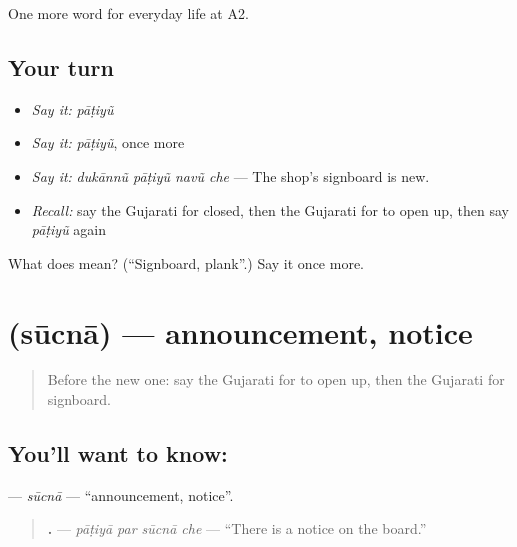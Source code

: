 \begin{grammarlens}[title={What you've built}]
One more word for everyday life at A2.
\end{grammarlens}

\subsection*{Your turn}
\begin{itemize}
\raggedright
  \item \emph{Say it:} \emph{pāṭiyũ}
  \item \emph{Say it:} \emph{pāṭiyũ}, once more
  \item \emph{Say it:} \emph{dukānnũ pāṭiyũ navũ che} — The shop's signboard is new.
  \item \emph{Recall:} say the Gujarati for closed, then the Gujarati for to open up, then say \emph{pāṭiyũ} again
\end{itemize}

\begin{tcolorbox}[breakable,colback=teal!4,colframe=teal!35!black,title={Before you move on}]
What does  mean? (\textquotedblleft{}Signboard, plank\textquotedblright{}.) Say it once more.
\end{tcolorbox}
\section[\texorpdfstring{\gu{સૂચના} (sūcnā)}{સૂચના (sūcnā)}]{ (sūcnā) — announcement, notice}

\label{lesson:GU-C198-sucna}



\begin{quote}
Before the new one: say the Gujarati for to open up, then the Gujarati for signboard.
\end{quote}

\subsection*{You'll want to know: }
\textbf{} — \emph{sūcnā} — \textquotedblleft{}announcement, notice\textquotedblright{}.

\begin{quote}
\textbf{   .} — \emph{pāṭiyā par sūcnā che} — \textquotedblleft{}There is a notice on the board.\textquotedblright{}
\end{quote}

